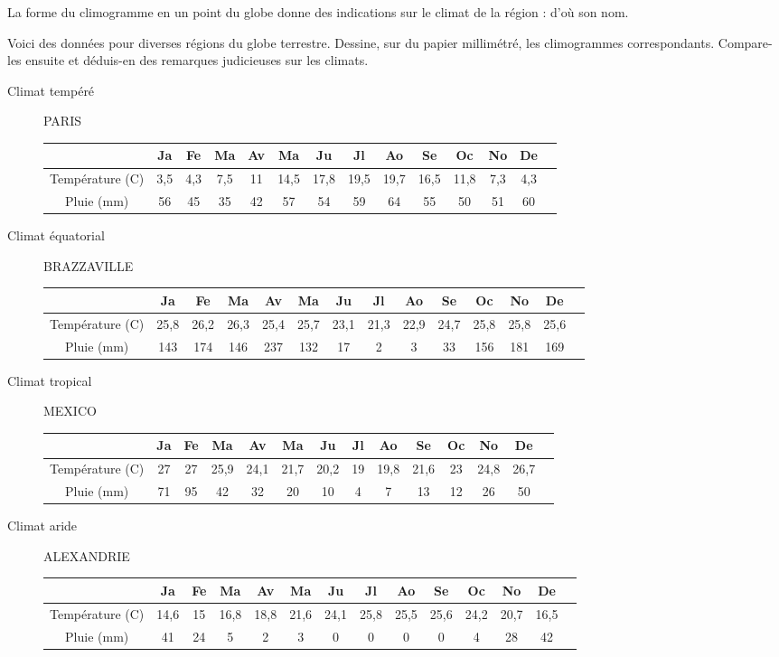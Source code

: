 La forme du climogramme en un point du globe donne des indications sur le climat de la région : d'où son nom.

Voici des données pour diverses régions du globe terrestre. Dessine, sur du papier millimétré, les climogrammes correspondants. Compare-les ensuite et déduis-en des remarques judicieuses sur les climats.
\begin{description}
\item[Climat tempéré] PARIS
{\small
  \begin{center}
    \begin{tabular}{|c|c|c|c|c|c|c|c|c|c|c|c|c|c|}
\cline{2-13}
\multicolumn{1}{c|}{}&Ja&Fe&Ma&Av&Ma&Ju&Jl&Ao&Se&Oc&No&De\\
\hline
Température (\degres{}C)&3,5&4,3&7,5&11&14,5&17,8&19,5&19,7&16,5&11,8&7,3&4,3\\
\hline
Pluie (mm)&56&45&35&42&57&54&59&64&55&50&51&60\\
\hline
    \end{tabular}
  \end{center}
}
\item[Climat équatorial] BRAZZAVILLE
{\small
  \begin{center}
    \begin{tabular}{|c|c|c|c|c|c|c|c|c|c|c|c|c|c|}
\cline{2-13}
\multicolumn{1}{c|}{}&Ja&Fe&Ma&Av&Ma&Ju&Jl&Ao&Se&Oc&No&De\\
\hline
Température (\degres{}C)&25,8&26,2&26,3&25,4&25,7&23,1&21,3&22,9&24,7&25,8&25,8&25,6\\
\hline
Pluie (mm)&143&174&146&237&132&17&2&3&33&156&181&169\\
\hline
    \end{tabular}
  \end{center}
}
\item[Climat tropical] MEXICO
{\small
  \begin{center}
    \begin{tabular}{|c|c|c|c|c|c|c|c|c|c|c|c|c|c|}
\cline{2-13}
\multicolumn{1}{c|}{}&Ja&Fe&Ma&Av&Ma&Ju&Jl&Ao&Se&Oc&No&De\\
\hline
Température (\degres{}C)&27&27&25,9&24,1&21,7&20,2&19&19,8&21,6&23&24,8&26,7\\
\hline
Pluie (mm)&71&95&42&32&20&10&4&7&13&12&26&50\\
\hline
    \end{tabular}
  \end{center}
}
\item[Climat aride] ALEXANDRIE
{\small
  \begin{center}
    \begin{tabular}{|c|c|c|c|c|c|c|c|c|c|c|c|c|c|}
\cline{2-13}
\multicolumn{1}{c|}{}&Ja&Fe&Ma&Av&Ma&Ju&Jl&Ao&Se&Oc&No&De\\
\hline
Température (\degres{}C)&14,6&15&16,8&18,8&21,6&24,1&25,8&25,5&25,6&24,2&20,7&16,5\\
\hline
Pluie (mm)&41&24&5&2&3&0&0&0&0&4&28&42\\
\hline
    \end{tabular}
  \end{center}
}
\end{description}